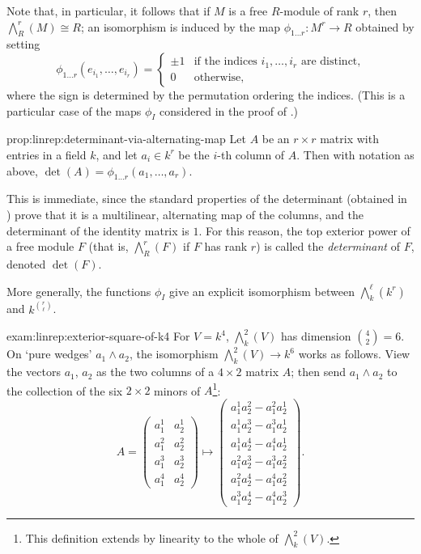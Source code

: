 Note that, in particular, it follows that if $M$ is a free $R$-module
of rank $r$, then $\bigwedge^r_R(M) \cong R$; an isomorphism is
induced by the map $\phi_{1\dots r} : M^r \to R$ obtained by setting
\[
  \phi_{1\dots r}(e_{i_1}, \dots, e_{i_r}) = \begin{cases} \pm 1 &
    \text{if the indices } i_1, \dots, i_r \text{ are
                                                                   distinct,} \\
    0 & \text{otherwise,}
  \end{cases}
\]
where the sign is determined by the permutation ordering the indices.
(This is a particular case of the maps $\phi_I$ considered in the
proof of .)

\begin{prop}{}{prop:linrep:determinant-via-alternating-map}
  Let $A$ be an $r \times r$ matrix with entries in a field $k$, and
  let $a_i \in k^r$ be the $i$-th column of $A$. Then with notation as
  above, $\det(A) = \phi_{1\dots r}(a_1, \dots, a_r)$.
\end{prop}

This is immediate, since the standard properties of the determinant
(obtained in ) prove that it is
a multilinear, alternating map of the columns, and the determinant of
the identity matrix is $1$.  For this reason, the top exterior power
of a free module $F$ (that is, $\bigwedge^r_R(F)$ if $F$ has rank $r$)
is called the \emph{determinant} of $F$, denoted $\det(F)$.

More generally, the functions $\phi_I$ give an explicit isomorphism
between $\bigwedge^\ell_k(k^r)$ and $k^{\binom{r}{\ell}}$.
\begin{exam}{}{exam:linrep:exterior-square-of-k4}
  For $V = k^4$, $\bigwedge^2_k(V)$ has dimension $\binom{4}{2} = 6$.
  On `pure wedges' $a_1 \wedge a_2$, the isomorphism
  $\bigwedge^2_k(V) \to k^6$ works as follows. View the vectors $a_1$,
  $a_2$ as the two columns of a $4 \times 2$ matrix $A$; then send
  $a_1 \wedge a_2$ to the collection of the six $2 \times 2$ minors of
  $A$\footnote{This definition extends by linearity to the whole of
    $\bigwedge^2_k(V)$.}:
  \[
    A = \begin{pmatrix}
      a_1^1 & a_2^1 \\ a_1^2 & a_2^2 \\
      a_1^3 & a_2^3 \\ a_1^4 & a_2^4
    \end{pmatrix}
    \mapsto
    \begin{pmatrix}
      a_1^1 a_2^2 - a_1^2 a_2^1 \\
      a_1^1 a_2^3 - a_1^3 a_2^1 \\
      a_1^1 a_2^4 - a_1^4 a_2^1 \\
      a_1^2 a_2^3 - a_1^3 a_2^2 \\
      a_1^2 a_2^4 - a_1^4 a_2^2 \\
      a_1^3 a_2^4 - a_1^4 a_2^3
    \end{pmatrix}.
  \]
\end{exam}

